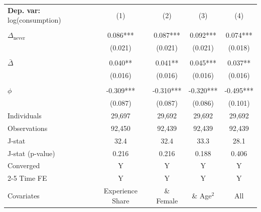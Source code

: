 \begin{tabular}{l cccc} \toprule  \textbf{Dep. var:}  log(consumption) 
                    &\multicolumn{1}{c}{(1)}   &\multicolumn{1}{c}{(2)}   &\multicolumn{1}{c}{(3)}   &\multicolumn{1}{c}{(4)}   \\
                    &               &               &               &               \\
\addlinespace
$\Delta_{\text{never}}$&       0.086***&       0.087***&       0.092***&       0.074***\\
                    &     (0.021)   &     (0.021)   &     (0.021)   &     (0.018)   \\
                    &               &               &               &               \\
\addlinespace
$\bar{\Delta}$      &       0.040** &       0.041** &       0.045***&       0.037** \\
                    &     (0.016)   &     (0.016)   &     (0.016)   &     (0.016)   \\
                    &               &               &               &               \\
\addlinespace
$\phi$              &      -0.309***&      -0.310***&      -0.320***&      -0.495***\\
                    &     (0.087)   &     (0.087)   &     (0.086)   &     (0.101)   \\
\addlinespace
Individuals         &      29,697   &      29,692   &      29,692   &      29,692   \\
Observations        &      92,450   &      92,439   &      92,439   &      92,439   \\
J-stat              &        32.4   &        32.4   &        33.3   &        28.1   \\
J-stat (p-value)    &       0.216   &       0.216   &       0.188   &       0.406   \\
Converged           &           Y   &           Y   &           Y   &           Y   \\
\cmidrule{2-5} Time FE & Y & Y & Y & Y \\ Covariates & Experience Share & \& Female & \& Age$^2$ & All \\ \bottomrule \end{tabular}
